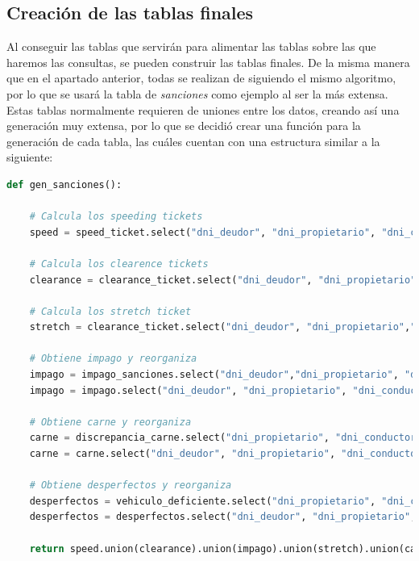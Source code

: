 \documentclass[]{article}
\begin{document}
\subsection{Creación de las tablas finales}
Al conseguir las tablas que servirán para alimentar las tablas sobre las que haremos las consultas, se pueden construir las tablas finales. De la misma manera que en el apartado anterior, todas se realizan de siguiendo el mismo algoritmo, por lo que se usará la tabla de \textit{sanciones} como ejemplo al ser la más extensa. Estas tablas normalmente requieren de uniones entre los datos, creando así una generación muy extensa, por lo que se decidió crear una función para la generación de cada tabla, las cuáles cuentan con una estructura similar a la siguiente:

\begin{lstlisting}[language=python, caption=Carga de datos en PySpark]
def gen_sanciones():

    # Calcula los speeding tickets
    speed = speed_ticket.select("dni_deudor", "dni_propietario", "dni_conductor", "fecha_grabacion", "estado", "matricula", "cantidad").withColumn("tipo", lit("velocidad"))

    # Calcula los clearence tickets
    clearance = clearance_ticket.select("dni_deudor", "dni_propietario","dni_conductor", "fecha_grabacion", "estado", "matricula", "cantidad").withColumn("tipo", lit("clearance"))

    # Calcula los stretch ticket
    stretch = clearance_ticket.select("dni_deudor", "dni_propietario","dni_conductor", "fecha_grabacion", "estado" ,"matricula", "cantidad").withColumn("tipo", lit("stretch"))

    # Obtiene impago y reorganiza
    impago = impago_sanciones.select("dni_deudor","dni_propietario", "dni_conductor", "fecha_grabacion", "cantidad", "matricula").withColumn("tipo", lit("impago")).withColumn("estado", lit("stand by"))
    impago = impago.select("dni_deudor", "dni_propietario", "dni_conductor", "fecha_grabacion", "estado", "matricula", "cantidad", "tipo")

    # Obtiene carne y reorganiza
    carne = discrepancia_carne.select("dni_propietario", "dni_conductor", "fecha_record", "matricula").withColumn("tipo", lit("discrepancia carne")).withColumn("estado", lit("stand by")).withColumn("cantidad", lit(1000)).withColumn("dni_deudor", discrepancia_carne["dni_conductor"])
    carne = carne.select("dni_deudor", "dni_propietario", "dni_conductor", "fecha_record", "estado", "matricula", "cantidad", "tipo")

    # Obtiene desperfectos y reorganiza
    desperfectos = vehiculo_deficiente.select("dni_propietario", "dni_conductor", "fecha_record", "matricula").withColumn("tipo", lit("discrepancia carne")).withColumn("estado", lit("stand by")).withColumn("cantidad", lit(1000)).withColumn("dni_deudor", vehiculo_deficiente["dni_propietario"])
    desperfectos = desperfectos.select("dni_deudor", "dni_propietario", "dni_conductor", "fecha_record", "estado", "matricula","cantidad", "tipo")

    return speed.union(clearance).union(impago).union(stretch).union(carne).union(desperfectos)
\end{lstlisting}
\end{document}
